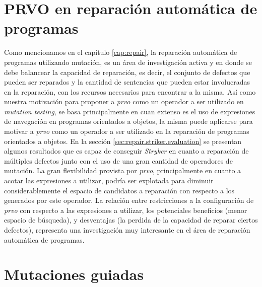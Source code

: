 \section{PRVO en reparaci\'on autom\'atica de programas}

Como mencionamos en el cap\'itulo \ref{cap:repair}, la reparaci\'on autom\'atica de programas utilizando mutaci\'on, es un \'area de investigaci\'on activa y en donde se debe balancear la capacidad de reparaci\'on, es decir, el conjunto de defectos que pueden ser reparados y la cantidad de sentencias que pueden estar involucradas en la reparaci\'on, con los recursos necesarios para encontrar a la misma. As\'i como nuestra motivaci\'on para proponer a \emph{prvo} como un operador a ser utilizado en \emph{mutation testing}, se basa principalmente en cuan extenso es el uso de expresiones de navegaci\'on en programas orientados a objetos, la misma puede aplicarse para motivar a \emph{prvo} como un operador a ser utilizado en la reparaci\'on de programas orientados a objetos. En la secci\'on \ref{sec:repair.striker.evaluation} se presentan algunos resultados que es capaz de conseguir \emph{Stryker} en cuanto a reparaci\'on de m\'ultiples defectos junto con el uso de una gran cantidad de operadores de mutaci\'on. La gran flexibilidad provista por \emph{prvo}, principalmente en cuanto a acotar las expresiones a utilizar, podr\'ia ser explotada para diminuir considerablemente el espacio de candidatos a reparaci\'on con respecto a los generados por este operador. La relaci\'on entre restricciones a la configuraci\'on de \emph{prvo} con respecto a las expresiones a utilizar, los potenciales beneficios (menor espacio de b\'usqueda), y desventajas (la perdida de la capacidad de reparar ciertos defectos), representa una investigaci\'on muy interesante en el \'area de reparaci\'on autom\'atica de programas.

\pagebreak
\section{Mutaciones guiadas}

